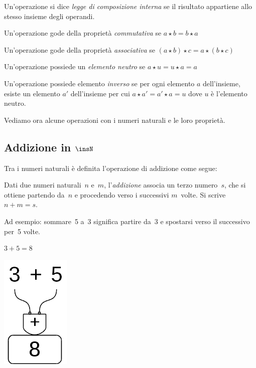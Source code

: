 \begin{itemize*}
 \item Un'operazione si dice \emph{legge di composizione interna} se
  il risultato appartiene allo stesso insieme degli operandi.
 \item Un'operazione gode della proprietà \emph{commutativa} se 
  $a \star b = b \star a$
 \item Un'operazione gode della proprietà \emph{associativa} se 
  $(a \star b) \star c = a \star (b \star c)$
 \item Un'operazione possiede un \emph{elemento neutro} se 
  $a \star u = u \star a = a$
 \item Un'operazione possiede elemento \emph{inverso} se per ogni
  elemento $a$ dell'insieme, esiste un elemento $a'$ 
  dell'insieme per cui $a \star a' = a' \star a = u$ dove $u$ è l'elemento
  neutro.
\end{itemize*}

Vediamo ora alcune operazioni con i numeri naturali e le loro proprietà.

\subsection{Addizione in $\insN$}

Tra i numeri naturali è definita l'operazione di addizione come segue:

\begin{definizione}
  Dati due numeri naturali~$n$ e~$m$, l'\emph{addizione} associa un terzo 
  numero~$s$, che si ottiene partendo da~$n$ e procedendo verso i successivi 
  $m$~volte. Si scrive~$n+m=s$.
\end{definizione}

Ad esempio: sommare~5 a~3 significa partire da~3 e spostarsi verso il 
successivo per~5 volte.

\begin{minipage}{0.80\textwidth}
 \centering
 $3+5=8$

 
\end{minipage}%
\begin{minipage}{0.15\textwidth}
 \centering
\begin{inaccessibleblock}
 \includegraphics[scale=0.35]{img/op_add.png}
\end{inaccessibleblock}
\end{minipage}%

